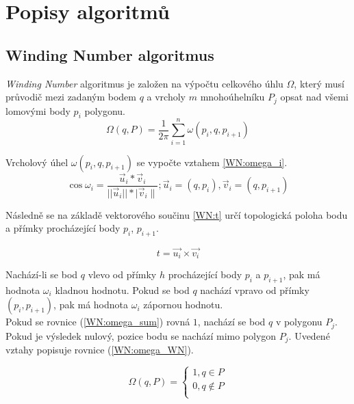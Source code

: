 \documentclass[11pt]{article}
\begin{document}

\section{Popisy algoritmů}
\subsection{Winding Number algoritmus}
\textit {Winding Number} algoritmus je založen na výpočtu celkového úhlu $\Omega$, který musí průvodič mezi zadaným bodem $q$ a vrcholy $m$ mnohoúhelníku ${P_{j}}$ opsat nad všemi lomovými body ${p_{i}}$ polygonu. 
\begin{equation}
\Omega(q, P)=\frac{1}{2 \pi} \sum_{i=1}^{n} \omega\left(p_{i}, q, p_{i+1}\right)
\label{WN:omega_sum}
\end{equation}

Vrcholový úhel $\omega\left(p_{i}, q, p_{i+1}\right)$ se vypočte vztahem \ref{WN:omega_i}. 
\begin{equation}
\cos \omega_{i}=\frac{\vec{u}_{i} * \vec{v}_{i}}{|| \vec{u}_{i}|| * \mid \vec{v}_{i} \|} ; \vec{u}_{i}=\left(q, p_{i}\right), \vec{v}_{i}=\left(q, p_{i+1}\right)
\label{WN:omega_i}
\end{equation}

Následně se na základě vektorového součinu \ref{WN:t}
určí topologická poloha bodu a přímky procházející body $p_{i}$, $p_{i+1}$.

\begin{equation}
t=\vec{u_{i}}\times\vec{v_{i}}
\label{WN:t}
\end{equation}

Nachází-li se bod $q$ vlevo od přímky $h$ procházející body $p_{i}$ a $p_{i+1}$, pak má hodnota $\omega_{i}$ kladnou hodnotu. Pokud se bod $q$ nachází vpravo od přímky $(p_{i}, p_{i+1})$, pak má hodnota $\omega_{i}$ zápornou hodnotu.\\

Pokud se rovnice (\ref{WN:omega_sum}) rovná $1$, nachází se bod $q$ v polygonu ${P_{j}}$. Pokud je výsledek nulový, pozice bodu se nachází mimo polygon ${P_{j}}$.  Uvedené vztahy popisuje rovnice (\ref{WN:omega_WN}).

\begin{equation}
\Omega(q, P)=\left\{\begin{array}{l}
1, q \in P \\
0, q \notin P \\
\end{array}\right.
\label{WN:omega_WN}
\end{equation}
\end{document}
